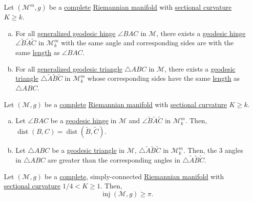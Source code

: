 \begin{lemma}
	Let \((\mathcal{M}^m , g)\) be a \hyperref[def:geodesically-complete]{complete} \hyperref[def:Riemannian-manifold]{Riemannian manifold} with \hyperref[def:sectional-curvature]{sectional curvature} \(K \geq k\).
	\begin{enumerate}[(a)]
		\item For all \hyperref[def:generalized-geodesic-hinge]{generalized geodesic hinge} \(\angle BAC\) in \(\mathcal{M} \), there exists a \hyperref[def:geodesic-hinge]{geodesic hinge} \(\angle \widetilde{B} \widetilde{A} \widetilde{C} \) in \(\mathcal{M} ^m_k\) with the same angle and corresponding sides are with the same \hyperref[def:length]{length} as \(\angle BAC\).
		\item For all \hyperref[def:generalized-geodesic-triangle]{generalized geodesic triangle} \(\triangle ABC\) in \(\mathcal{M} \), there exists a \hyperref[def:geodesic-triangle]{geodesic triangle} \(\triangle \widetilde{A} \widetilde{B} \widetilde{C} \) in \(\mathcal{M} ^m_k\) whose corresponding sides have the same \hyperref[def:length]{length} as \(\triangle ABC\).
	\end{enumerate}
\end{lemma}

\begin{theorem}\label{thm:Toponogor}
	Let \((\mathcal{M} , g)\) be a \hyperref[def:geodesically-complete]{complete} \hyperref[def:Riemannian-manifold]{Riemannian manifold} with \hyperref[def:sectional-curvature]{sectional curvature} \(K \geq k\).
	\begin{enumerate}[(a)]
		\item Let \(\angle BAC\) be a \hyperref[def:geodesic-hinge]{geodesic hinge} in \(\mathcal{M} \) and \(\angle \widetilde{B} \widetilde{A} \widetilde{C} \) in \(\mathcal{M} _k^m\). Then, \(\mathop{\mathrm{dist}}(B, C) = \mathop{\mathrm{dist}}(\widetilde{B} , \widetilde{C} ) \).
		\item Let \(\triangle ABC\) be a \hyperref[def:geodesic-triangle]{geodesic triangle} in \(\mathcal{M} \), \(\triangle \widetilde{A} \widetilde{B} \widetilde{C} \) in \(\mathcal{M} _k^m\). Then, the \(3\) angles in \(\triangle ABC\) are greater than the corresponding angles in \(\triangle \widetilde{A} \widetilde{B} \widetilde{C} \).
	\end{enumerate}
\end{theorem}

\begin{theorem}[Klingenberg]\label{thm:Klingenberg}
	Let \((\mathcal{M} , g)\) be a \hyperref[def:geodesically-complete]{complete}, simply-connected \hyperref[def:Riemannian-manifold]{Riemannian manifold} with \hyperref[def:sectional-curvature]{sectional curvature} \(1 / 4 < K \geq 1\). Then,
	\[
		\mathop{\mathrm{inj}}(\mathcal{M} , g) \geq \pi .
	\]
\end{theorem}

